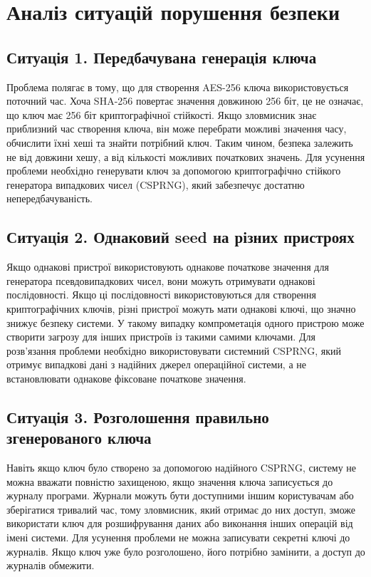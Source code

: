 \section{Аналіз ситуацій порушення безпеки}


\subsection{Ситуація 1. Передбачувана генерація ключа}

Проблема полягає в тому, що для створення AES-256 ключа використовується поточний час. 
Хоча SHA-256 повертає значення довжиною 256 біт, це не означає, що ключ має 256 біт криптографічної стійкості. 
Якщо зловмисник знає приблизний час створення ключа, він може перебрати можливі значення часу, 
обчислити їхні хеші та знайти потрібний ключ. Таким чином, безпека залежить не від довжини хешу, 
а від кількості можливих початкових значень. Для усунення проблеми необхідно генерувати ключ за допомогою 
криптографічно стійкого генератора випадкових чисел (CSPRNG), який забезпечує достатню непередбачуваність.

\subsection{Ситуація 2. Однаковий seed на різних пристроях}

Якщо однакові пристрої використовують однакове початкове значення для генератора псевдовипадкових чисел, 
вони можуть отримувати однакові послідовності. Якщо ці послідовності використовуються для створення 
криптографічних ключів, різні пристрої можуть мати однакові ключі, що значно знижує безпеку системи. 
У такому випадку компрометація одного пристрою може створити загрозу для інших пристроїв із такими самими ключами. 
Для розв'язання проблеми необхідно використовувати системний CSPRNG, який отримує випадкові дані з надійних джерел операційної системи, 
а не встановлювати однакове фіксоване початкове значення.

\subsection{Ситуація 3. Розголошення правильно згенерованого ключа}

Навіть якщо ключ було створено за допомогою надійного CSPRNG, систему не можна вважати повністю захищеною, 
якщо значення ключа записується до журналу програми. Журнали можуть бути доступними іншим користувачам 
або зберігатися тривалий час, тому зловмисник, який отримає до них доступ, зможе використати ключ для 
розшифрування даних або виконання інших операцій від імені системи. Для усунення проблеми не можна записувати 
секретні ключі до журналів. Якщо ключ уже було розголошено, його потрібно замінити, а доступ до журналів обмежити.


